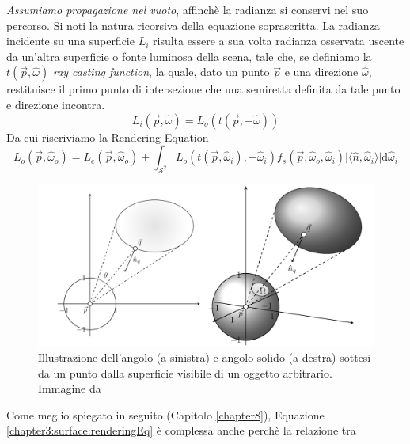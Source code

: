 \textit{Assumiamo propagazione nel vuoto}, affinch\`e la radianza si conservi nel suo percorso. Si noti la natura ricorsiva della equazione 
soprascritta. La radianza incidente su una superficie $L_i$ risulta essere a sua volta radianza osservata uscente da un'altra superficie o fonte 
luminosa della scena, tale che, se definiamo la $t(\vec{p},\hat{\omega})$ \textit{ray casting function}, la quale, dato un punto $\vec{p}$ e 
una direzione $\hat{\omega}$, restituisce il primo punto di intersezione che una semiretta definita da tale punto e direzione incontra.\footnotemark{}
\begin{equation}
	L_i(\vec{p},\hat{\omega}) = L_o(t(\vec{p},-\hat{\omega}))
\end{equation}
Da cui riscriviamo la Rendering Equation
\begin{equation}\label{chapter3:surface:renderingEq}
	L_o(\vec{p},\hat{\omega}_o) = L_e(\vec{p},\hat{\omega}_o) + \int_{\mathcal{S}^2}%
		L_o(t(\vec{p}, \hat{\omega}_i),-\hat{\omega}_i)f_s(\vec{p},\hat{\omega}_o,\hat{\omega}_i)%
		\vert\langle\hat{n},\hat{\omega}_i\rangle\vert\mathrm{d}\hat{\omega}_i
\end{equation}
\begin{figure}[tb]
	\includegraphics[width=\linewidth]{../assets/chapter3_surface_angle2area.png}
	\caption{Illustrazione dell'angolo (a sinistra) e angolo solido (a destra) sottesi da un punto dalla superficie visibile di un oggetto arbitrario.
		Immagine da \cite{pegoraro}}
	\label{chapter3:surface:angle2area}
\end{figure}
Come meglio spiegato in seguito (Capitolo \ref{chapter8}), Equazione \ref{chapter3:surface:renderingEq} \`e complessa anche perch\`e la relazione tra 
